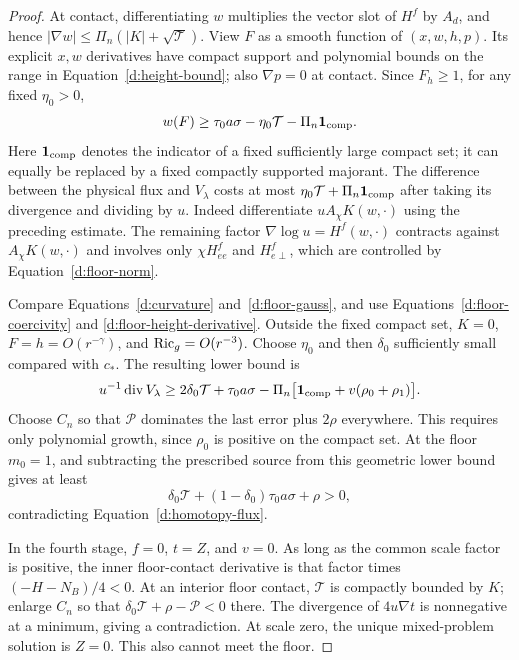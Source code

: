\begin{proof}
At contact, differentiating $w$ multiplies the vector slot of $H^f$
by $A_d$, and hence
$|\nabla w|\le\Pi_n(|K|+\sqrt{\mathcal T})$.
View $F$ as a smooth function of $(x,w,h,p)$.  Its explicit $x,w$
derivatives have compact support and polynomial bounds on the
range in Equation~\eqref{d:height-bound}; also $\nabla p=0$ at contact.
Since $F_h\ge1$, for any fixed $\eta_0>0$,
\begin{equation}\label{d:floor-height-derivative}
 w(F)\ge\tau_0a\sigma-\eta_0\mathcal T
                  -\Pi_n\mathbf1_{\rm comp}.
\end{equation}
Here $\mathbf1_{\rm comp}$ denotes the indicator of a fixed
sufficiently large compact set; it can equally be replaced by a
fixed compactly supported majorant.
The difference between the physical flux and $V_\lambda$ costs at
most $\eta_0\mathcal T+\Pi_n\mathbf1_{\rm comp}$ after taking its
divergence and dividing by $u$.  Indeed differentiate
$uA_\chi K(w,\cdot)$ using the preceding estimate.  The remaining
factor $\nabla\log u=H^f(w,\cdot)$ contracts against
$A_\chi K(w,\cdot)$ and involves only
$\chi H^f_{ee}$ and $H^f_{e\perp}$, which are controlled by
Equation~\eqref{d:floor-norm}.

Compare Equations~\eqref{d:curvature} and~\eqref{d:floor-gauss}, and use
Equations~\eqref{d:floor-coercivity} and
\eqref{d:floor-height-derivative}.  Outside the fixed compact set,
$K=0$, $F=h=O(r^{-\gamma})$, and $\operatorname{Ric}_g=O(r^{-3})$.
Choose $\eta_0$ and then $\delta_0$ sufficiently small compared with
$c_*$.  The resulting lower bound is
\begin{equation}\label{d:floor-divergence}
 u^{-1}\operatorname{div} V_\lambda
 \ge2\delta_0\mathcal T+\tau_0a\sigma
          -\Pi_n\bigl[\mathbf1_{\rm comp}+v(\rho_0+\rho_1)\bigr].
\end{equation}
Choose $C_n$ so that $\mathcal P$ dominates the last error plus
$2\rho$ everywhere.  This requires only polynomial growth, since
$\rho_0$ is positive on the compact set.  At the floor $m_0=1$,
and subtracting the prescribed source from this geometric lower
bound gives at least
\[
 \delta_0\mathcal T+(1-\delta_0)\tau_0a\sigma+\rho>0,
\]
contradicting Equation~\eqref{d:homotopy-flux}.

In the fourth stage, $f=0$, $t=Z$, and $v=0$.  As long as the common
scale factor is positive, the inner floor-contact derivative is
that factor times $(-H-N_B)/4<0$.  At an interior floor contact,
$\mathcal T$ is compactly bounded by $K$; enlarge $C_n$ so that
$\delta_0\mathcal T+\rho-\mathcal P<0$ there.  The divergence of
$4u\nabla t$ is nonnegative at a minimum, giving a contradiction.
At scale zero, the unique mixed-problem solution is $Z=0$.  This
also cannot meet the floor.
\end{proof}

